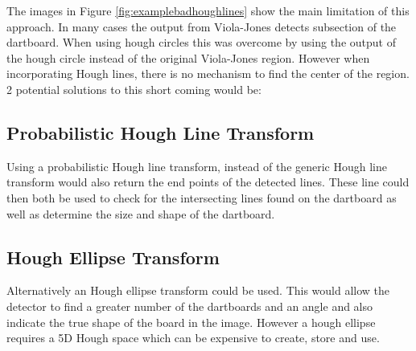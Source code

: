 \documentclass{article}
\begin{document}
\begin{multicols}{2}

\label{fig:examplebadhoughlines}

The images in Figure \ref{fig:examplebadhoughlines} show the main limitation of this approach. In many cases the output from Viola-Jones detects subsection of the dartboard. When using hough circles this was overcome by using the output of the hough circle instead of the original Viola-Jones region. However when incorporating Hough lines, there is no mechanism to find the center of the region. 2 potential solutions to this short coming would be:

\subsection{Probabilistic Hough Line Transform}

Using a probabilistic Hough line transform, instead of the generic Hough line transform would also return the end points of the detected lines. These line could then both be used to check for the intersecting lines found on the dartboard as well as determine the size and shape of the dartboard. 

\subsection{Hough Ellipse Transform}

Alternatively an Hough ellipse transform could be used. This would allow the detector to find a greater number of the dartboards and an angle and also indicate the true shape of the board in the image. However a hough ellipse requires a 5D Hough space which can be expensive to create, store and use.

\end{multicols}



\end{document}
